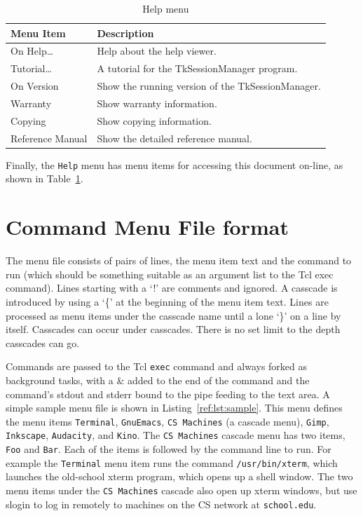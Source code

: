 \begin{table}[hbpt]
\begin{centering}
\begin{tabular}{|l|p{3in}|}
\hline
Menu Item & Description \\
\hline
\hline
On Help\ldots & Help about the help viewer. \\
\hline
Tutorial\ldots & A tutorial for the TkSessionManager program.\\
\hline
On Version & Show the running version of the TkSessionManager.\\
\hline
Warranty & Show warranty information.\\
\hline
Copying & Show copying information.\\
\hline
Reference Manual & Show the detailed reference manual.\\
\hline
\end{tabular}
\caption{Help menu}
\label{ref:tab:helpmenu}
\end{centering}
\end{table}
Finally, the \texttt{Help} menu has menu items for accessing this
document on-line, as shown in Table~\ref{ref:tab:helpmenu}.

\section{Command Menu File format}
\label{sect:CommandMenuFile}

The menu file consists of pairs of lines, the menu item text and the
command to run (which should be something suitable as an argument list
to the Tcl exec command).  Lines starting with a `!' are comments and
ignored. A casscade is introduced by using a `\{' at the beginning of the
menu item text.  Lines are processed as menu items under the casscade
name until a lone `\}' on a line by itself.  Casscades can occur under
casscades.  There is no set limit to the depth casscades can go.

Commands are passed to the Tcl \texttt{exec} command and always forked
as background tasks, with a \& added to the end of the command and the
command's stdout and stderr bound to the pipe feeding to the text area.
A simple sample menu file is shown in Listing~\ref{ref:lst:sample}.
This menu defines the menu items \texttt{Terminal}, \texttt{GnuEmacs},
\texttt{CS Machines} (a cascade menu), \texttt{Gimp},
\texttt{Inkscape}, \texttt{Audacity}, and \texttt{Kino}.  The
\texttt{CS Machines} cascade menu has two items, \texttt{Foo} and
\texttt{Bar}. Each of the items is followed by the command line to run.
For example the \texttt{Terminal} menu item runs the command
\texttt{/usr/bin/xterm}, which launches the old-school xterm program,
which opens up a shell window.  The two menu items under the \texttt{CS
Machines} cascade also open up xterm windows, but use slogin to log in
remotely to machines on the CS network at \texttt{school.edu}.

